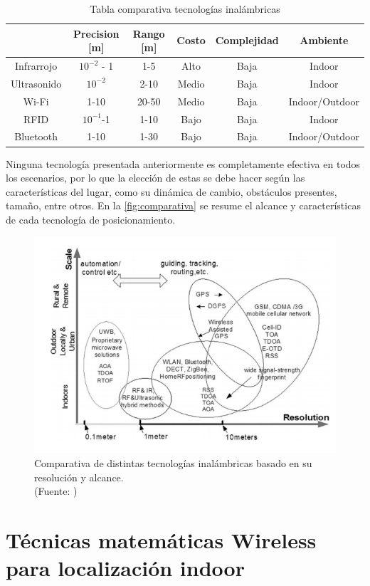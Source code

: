 \begin{table}[h]
\centering
\caption{Tabla comparativa tecnologías inalámbricas}
\label{my-label}
\begin{tabular}{|c|c|c|c|c|c|}
\hline
            & Precision {[}m{]}             & Rango {[}m{]} & Costo & Complejidad & Ambiente       \\ \hline
Infrarrojo  & \(10^{-2}\) - 1 & 1-5           & Alto  & Baja        & Indoor         \\ \hline
Ultrasonido & \(10^{-2}\)     & 2-10          & Medio & Baja        & Indoor         \\ \hline
Wi-Fi       & 1-10                          & 20-50         & Medio & Baja        & Indoor/Outdoor \\ \hline
RFID        & \(10^{-1}\)-1   & 1-10          & Bajo  & Baja        & Indoor         \\ \hline
Bluetooth   & 1-10                          & 1-30          & Bajo  & Baja        & Indoor/Outdoor \\ \hline
\end{tabular}
\end{table}

Ninguna tecnología presentada anteriormente es completamente efectiva en todos los escenarios, por lo que la elección de estas se debe hacer según las características del lugar, como su dinámica de cambio, obstáculos presentes, tamaño, entre otros. En la \autoref{fig:comparativa} se resume el alcance y características de cada tecnología de posicionamiento.


\begin{figure}[ht!]
\centering
\includegraphics[width=.4\textwidth]{figures/comparativa.png}
\caption[abs]{Comparativa de distintas tecnologías inalámbricas basado en su resolución y alcance.\\
{\scriptsize (Fuente: \citep{Liu:2007:SWI:2220431.2221077})}}
\label{fig:comparativa}
\end{figure}

\section{Técnicas  matemáticas Wireless para localización indoor}

